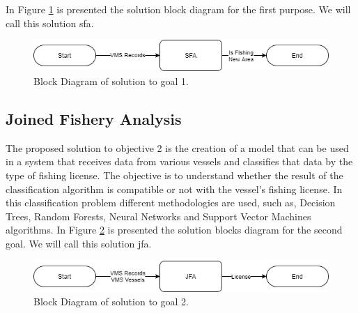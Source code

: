 In Figure \ref{fig:block_sfa} is presented the solution block diagram for the first purpose. We will call this solution \gls{sfa}.


\begin{figure}[h]
\centering
\includegraphics[width=0.8\linewidth]{Chapters/img/Block1-Page-1.png}
\caption{Block Diagram of solution to goal 1.}
\label{fig:block_sfa}
\end{figure}

\subsection{Joined Fishery Analysis} %
\label{sec:int_jfa}

The proposed solution to objective 2 is the creation of a model that can be used in a system that receives data from various vessels and classifies that data by the type of fishing license. The objective is to understand whether the result of the classification algorithm is compatible or not with the vessel's fishing license.
In this classification problem different methodologies are used, such as,  Decision Trees, Random Forests, Neural Networks and Support Vector Machines algorithms.
In Figure \ref{fig:block_jfa} is presented the solution blocks diagram for the second goal.  We will call this solution \gls{jfa}.

\begin{figure}[h]
\centering
\includegraphics[width=0.8\linewidth]{Chapters/img/Block1-Page-2.png}
\caption{Block Diagram of solution to goal 2.}
\label{fig:block_jfa}
\end{figure}

